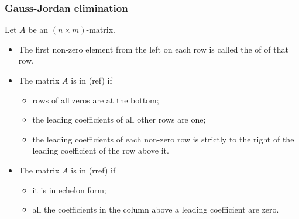 \subsubsection{Gauss-Jordan elimination}
\begin{definition}
Let $A$ be an $(n\times m)$-matrix.
\begin{itemize}
\item The first non-zero element from the left on each row is called the  of  of that row.
\item The matrix $A$ is in  (ref) if
\begin{itemize}
\item rows of all zeros are at the bottom;
\item the leading coefficients of all other rows are one;
\item the leading coefficients of each non-zero row is strictly to the right of the leading coefficient of the row above it.
\end{itemize}
\item The matrix $A$ is in  (rref) if
\begin{itemize}
\item it is in echelon form;
\item all the coefficients in the column above a leading coefficient are zero.
\end{itemize}
\end{itemize}
\end{definition}

